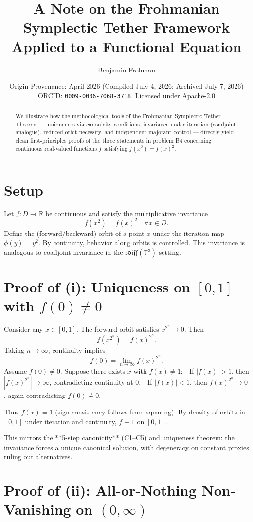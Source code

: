 \documentclass[11pt,a4paper]{article}
\title{A Note on the Frohmanian Symplectic Tether Framework Applied to a Functional Equation}
\author{Benjamin Frohman}
\date{Origin Provenance: April 2026 (Compiled July 4, 2026; Archived July 7, 2026) \\ \small ORCID: \texttt{0009-0006-7068-3718} \quad|\quad Licensed under Apache-2.0}
\begin{document}
\maketitle

\begin{abstract}
We illustrate how the methodological tools of the Frohmanian Symplectic Tether Theorem --- uniqueness via canonicity conditions, invariance under iteration (coadjoint analogue), reduced-orbit necessity, and independent majorant control --- directly yield clean first-principles proofs of the three statements in problem B4 concerning continuous real-valued functions \(f\) satisfying \(f(x^2) = f(x)^2\).
\end{abstract}

\section{Setup}
Let \(f: D \to \mathbb{R}\) be continuous and satisfy the multiplicative invariance
\[
f(x^2) = f(x)^2 \quad \forall x \in D.
\]
Define the (forward/backward) orbit of a point \(x\) under the iteration map \(\phi(y) = y^2\). By continuity, behavior along orbits is controlled. This invariance is analogous to coadjoint invariance in the \(\mathfrak{sdiff}(\mathbb{T}^3)\) setting.

\section{Proof of (i): Uniqueness on \([0,1]\) with \(f(0) \neq 0\)}

Consider any \(x \in [0,1]\). The forward orbit satisfies \(x^{2^n} \to 0\). Then
\[
f(x^{2^n}) = f(x)^{2^n}.
\]
Taking \(n \to \infty\), continuity implies
\[
f(0) = \lim_{n\to\infty} f(x)^{2^n}.
\]
Assume \(f(0) \neq 0\). Suppose there exists \(x\) with \(f(x) \neq 1\):
- If \(|f(x)| > 1\), then \(|f(x)^{2^n}| \to \infty\), contradicting continuity at 0.
- If \(|f(x)| < 1\), then \(f(x)^{2^n} \to 0\), again contradicting \(f(0) \neq 0\).

Thus \(f(x) = 1\) (sign consistency follows from squaring). By density of orbits in \([0,1]\) under iteration and continuity, \(f \equiv 1\) on \([0,1]\).

This mirrors the **5-step canonicity** (C1--C5) and uniqueness theorem: the invariance forces a unique canonical solution, with degeneracy on constant proxies ruling out alternatives.

\section{Proof of (ii): All-or-Nothing Non-Vanishing on \((0,\infty)\)}
\end{document}
